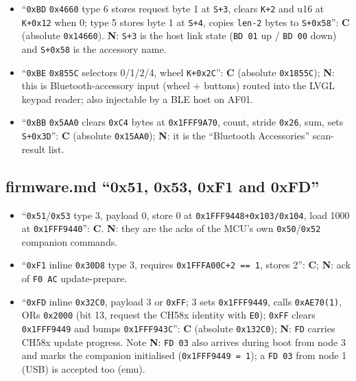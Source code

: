 \begin{itemize}
\tightlist
\item
  ``\texttt{0xBD} \texttt{0x4660} type 6 stores request byte 1 at
  \texttt{S+3}, clears \texttt{K+2} and u16 at \texttt{K+0x12} when 0;
  type 5 stores byte 1 at \texttt{S+4}, copies \texttt{len-2} bytes to
  \texttt{S+0x58}'': \textbf{C} (absolute \texttt{0x14660}). \textbf{N}:
  \texttt{S+3} is the host link state (\texttt{BD\ 01} up /
  \texttt{BD\ 00} down) and \texttt{S+0x58} is the accessory name.
\item
  ``\texttt{0xBE} \texttt{0x855C} selectors 0/1/2/4, wheel
  \texttt{K+0x2C}'': \textbf{C} (absolute \texttt{0x1855C}); \textbf{N}:
  this is Bluetooth-accessory input (wheel + buttons) routed into the
  LVGL keypad reader; also injectable by a BLE host on AF01.
\item
  ``\texttt{0xBB} \texttt{0x5AA0} clears \texttt{0xC4} bytes at
  \texttt{0x1FFF9A70}, count, stride \texttt{0x26}, sum, sets
  \texttt{S+0x3D}'': \textbf{C} (absolute \texttt{0x15AA0}); \textbf{N}:
  it is the ``Bluetooth Accessories'' scan-result list.
\end{itemize}

\subsection{firmware.md ``0x51, 0x53, 0xF1 and
0xFD''}\label{firmware.md-0x51-0x53-0xf1-and-0xfd}

\begin{itemize}
\tightlist
\item
  ``\texttt{0x51}/\texttt{0x53} type 3, payload 0, store 0 at
  \texttt{0x1FFF9448+0x103/\allowbreak{}0x104}, load 1000 at \texttt{0x1FFF9440}'':
  \textbf{C}. \textbf{N}: they are the acks of the MCU's own
  \texttt{0x50}/\texttt{0x52} companion commands.
\item
  ``\texttt{0xF1} inline \texttt{0x30D8} type 3, requires
  \texttt{0x1FFFA00C+2\ ==\ 1}, stores 2'': \textbf{C}; \textbf{N}: ack
  of \texttt{F0\ AC} update-prepare.
\item
  ``\texttt{0xFD} inline \texttt{0x32C0}, payload 3 or \texttt{0xFF}; 3
  sets \texttt{0x1FFF9449}, calls \texttt{0xAE70(1)}, ORs
  \texttt{0x2000} (bit 13, request the CH58x identity with \texttt{E0});
  \texttt{0xFF} clears \texttt{0x1FFF9449} and bumps
  \texttt{0x1FFF943C}'': \textbf{C} (absolute \texttt{0x132C0});
  \textbf{N}: \texttt{FD} carries CH58x update progress. Note
  \textbf{N}: \texttt{FD\ 03} also arrives during boot from node 3 and
  marks the companion initialised (\texttt{0x1FFF9449\ =\ 1}); a
  \texttt{FD\ 03} from node 1 (USB) is accepted too (emu).
\end{itemize}

